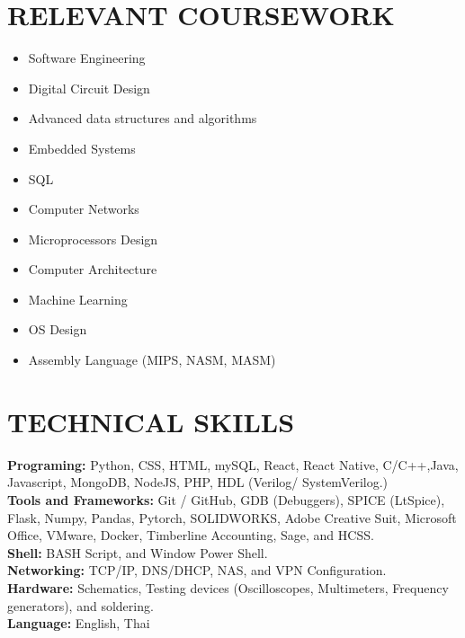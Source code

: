 \documentclass[letterpaper,11pt]{article}
\newcommand{\resumeSubHeadingListStart}{\begin{itemize}[leftmargin=0.0in, label={}]}
\newcommand{\resumeSubHeadingListEnd}{\end{itemize}}
\begin{document}
\section{RELEVANT COURSEWORK}
    \begin{multicols}{4}
        \begin{itemize}[itemsep=-1pt, parsep=3pt]
            \item \small Software Engineering
            \item \small Digital Circuit Design 
            \item \small Advanced data structures and algorithms
            \item \small Embedded Systems
            \item \small SQL 
            \item \small Computer Networks
            \item \small Microprocessors Design
            \item \small Computer Architecture
            \item \small Machine Learning
            \item \small OS Design
            \item \small Assembly Language (MIPS, NASM, MASM)
        \end{itemize}
    \end{multicols}
    \vspace*{1.5\multicolsep}
\vspace{-1pt}

\section{TECHNICAL SKILLS}
\begin{itemize}[left=0.15in, label={}]
    \small{
    \item \textbf{Programing:} Python, CSS, HTML, mySQL, React, React Native, C/C++,Java, Javascript, MongoDB, NodeJS, PHP, 
    HDL (Verilog/ SystemVerilog.) \\
    \textbf{Tools and Frameworks:} Git / GitHub, GDB (Debuggers), SPICE (LtSpice), Flask, Numpy, Pandas, Pytorch, SOLIDWORKS, Adobe Creative Suit, Microsoft Office, VMware, Docker, Timberline Accounting, Sage, and HCSS. \\
    \textbf{Shell:} BASH Script, and Window Power Shell. \\
    \textbf{Networking:} TCP/IP, DNS/DHCP, NAS, and VPN Configuration. \\
    \textbf{Hardware:} Schematics, Testing devices (Oscilloscopes, Multimeters, Frequency generators), and soldering. \\
    \textbf{Language:} English, Thai \\
    }
\end{itemize}
\vspace{-15pt}
\end{document}
